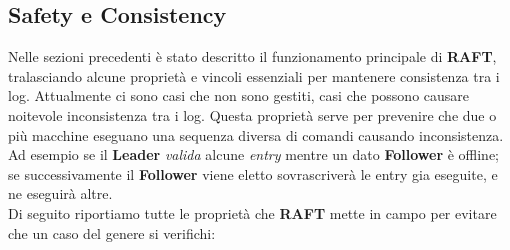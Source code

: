 \subsection{Safety e Consistency}
Nelle sezioni precedenti è stato descritto il funzionamento principale di \textbf{RAFT}, tralasciando alcune proprietà e vincoli essenziali per mantenere consistenza tra i log.
Attualmente ci sono casi che non sono gestiti, casi che possono causare noitevole inconsistenza tra i log.
Questa proprietà serve per prevenire che due o più macchine eseguano una sequenza diversa di comandi causando inconsistenza.
Ad esempio se il \textbf{Leader} \textit{valida} alcune \textit{entry} mentre un dato \textbf{Follower} è offline; se successivamente il \textbf{Follower} viene eletto sovrascriverà le entry gia eseguite, e ne eseguirà altre.  
\\
Di seguito riportiamo tutte le proprietà che \textbf{RAFT} mette in campo per evitare che un caso del genere si verifichi:
